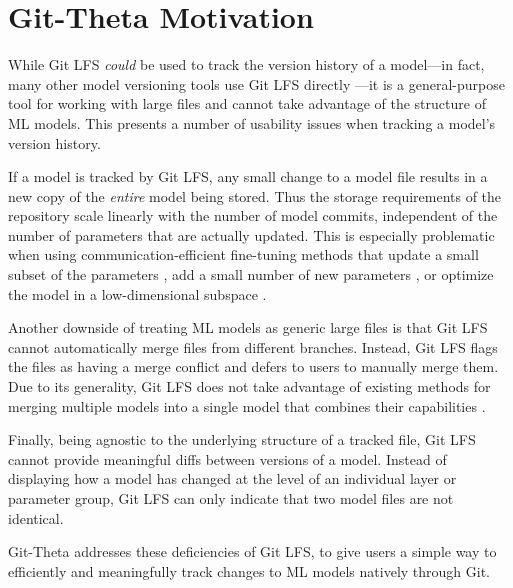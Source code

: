 \section{Git-Theta Motivation}
While Git LFS \textit{could} be used to track the version history of a model---in fact, many other model versioning tools use Git LFS directly \cite{TODO}---it is a general-purpose tool for working with large files and cannot take advantage of the structure of ML models. This presents a number of usability issues when tracking a model's version history. 


If a model is tracked by Git LFS, any small change to a model file results in a new copy of the \emph{entire} model being stored. Thus the storage requirements of the repository scale linearly with the number of model commits, independent of the number of parameters that are actually updated. This is especially problematic when using communication-efficient fine-tuning methods that update a small subset of the parameters \cite{sung2021sparse,guo2020diffpruning,zaken2021bitfit}, add a small number of new parameters \cite{liu2022tfew,hu2021lora,houlsby2019adapter,lester2021tuning,li2021prefix,mahabadi2021compacter}, or optimize the model in a low-dimensional subspace \cite{aghajanyan2020intrinsic}.

Another downside of treating ML models as generic large files is that Git LFS cannot automatically merge files from different branches. Instead, Git LFS flags the files as having a merge conflict and defers to users to manually merge them. Due to its generality, Git LFS does not take advantage of existing methods for merging multiple models into a single model that combines their capabilities \cite{matena2021merging,wortsman2021robust}.

Finally, being agnostic to the underlying structure of a tracked file, Git LFS cannot provide meaningful diffs between versions of a model. Instead of displaying how a model has changed at the level of an individual layer or parameter group, Git LFS can only indicate that two model files are not identical.

Git-Theta addresses these deficiencies of Git LFS, to give users a simple way to efficiently and meaningfully track changes to ML models natively through Git. 

